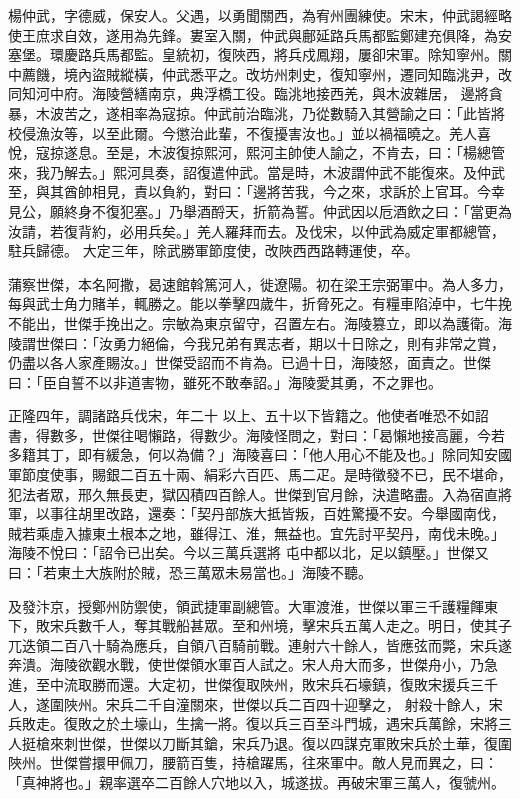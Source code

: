 \begin{pinyinscope}
 楊仲武，字德威，保安人。父遇，以勇聞關西，為宥州團練使。宋末，仲武謁經略使王庶求自效，遂用為先鋒。婁室入關，仲武與鄜延路兵馬都監鄭建充俱降，為安塞堡。環慶路兵馬都監。皇統初，復陜西，將兵戍鳳翔，屢卻宋軍。除知寧州。關中薦饑，境內盜賊縱橫，仲武悉平之。改坊州刺史，復知寧州，遷同知臨洮尹，改同知河中府。海陵營繕南京，典浮橋工役。臨洮地接西羌，與木波雜居，
 邊將貪暴，木波苦之，遂相率為寇掠。仲武前治臨洮，乃從數騎入其營諭之曰：「此皆將校侵漁汝等，以至此爾。今懲治此輩，不復擾害汝也。」並以禍福曉之。羌人喜悅，寇掠遂息。至是，木波復掠熙河，熙河主帥使人諭之，不肯去，曰：「楊總管來，我乃解去。」熙河具奏，詔復遣仲武。當是時，木波謂仲武不能復來。及仲武至，與其酋帥相見，責以負約，對曰：「邊將苦我，今之來，求訴於上官耳。今幸見公，願終身不復犯塞。」乃舉酒酹天，折箭為誓。仲武因以卮酒飲之曰：「當更為汝請，若復背約，必用兵矣。」羌人羅拜而去。及伐宋，以仲武為威定軍都總管，駐兵歸德。
 大定三年，除武勝軍節度使，改陜西西路轉運使，卒。



 蒲察世傑，本名阿撒，曷速館斡篤河人，徙遼陽。初在梁王宗弼軍中。為人多力，每與武士角力賭羊，輒勝之。能以拳擊四歲牛，折脅死之。有糧車陷淖中，七牛挽不能出，世傑手挽出之。宗敏為東京留守，召置左右。海陵篡立，即以為護衛。海陵謂世傑曰：「汝勇力絕倫，今我兄弟有異志者，期以十日除之，則有非常之賞，仍盡以各人家產賜汝。」世傑受詔而不肯為。已過十日，海陵怒，面責之。世傑曰：「臣自誓不以非道害物，雖死不敢奉詔。」海陵愛其勇，不之罪也。



 正隆四年，調諸路兵伐宋，年二十
 以上、五十以下皆籍之。他使者唯恐不如詔書，得數多，世傑往喝懶路，得數少。海陵怪問之，對曰：「曷懶地接高麗，今若多籍其丁，即有緩急，何以為備？」海陵喜曰：「他人用心不能及也。」除同知安國軍節度使事，賜銀二百五十兩、絹彩六百匹、馬二疋。是時徵發不已，民不堪命，犯法者眾，邢久無長吏，獄囚積四百餘人。世傑到官月餘，決遣略盡。入為宿直將軍，以事往胡里改路，還奏：「契丹部族大抵皆叛，百姓驚擾不安。今舉國南伐，賊若乘虛入據東土根本之地，雖得江、淮，無益也。宜先討平契丹，南伐未晚。」海陵不悅曰：「詔令已出矣。今以三萬兵選將
 屯中都以北，足以鎮壓。」世傑又曰：「若東土大族附於賊，恐三萬眾未易當也。」海陵不聽。



 及發汴京，授鄭州防禦使，領武捷軍副總管。大軍渡淮，世傑以軍三千護糧餫東下，敗宋兵數千人，奪其戰船甚眾。至和州境，擊宋兵五萬人走之。明日，使其子兀迭領二百八十騎為應兵，自領八百騎前戰。連射六十餘人，皆應弦而斃，宋兵遂奔潰。海陵欲觀水戰，使世傑領水軍百人試之。宋人舟大而多，世傑舟小，乃急進，至中流取勝而還。大定初，世傑復取陜州，敗宋兵石壕鎮，復敗宋援兵三千人，遂圍陜州。宋兵二千自潼關來，世傑以兵二百四十迎擊之，
 射殺十餘人，宋兵敗走。復敗之於土壕山，生擒一將。復以兵三百至斗門城，遇宋兵萬餘，宋將三人挺槍來刺世傑，世傑以刀斷其鎗，宋兵乃退。復以四謀克軍敗宋兵於土華，復圍陜州。世傑嘗擐甲佩刀，腰箭百隻，持槍躍馬，往來軍中。敵人見而異之，曰：「真神將也。」親率選卒二百餘人穴地以入，城遂拔。再破宋軍三萬人，復虢州。




\end{pinyinscope}
